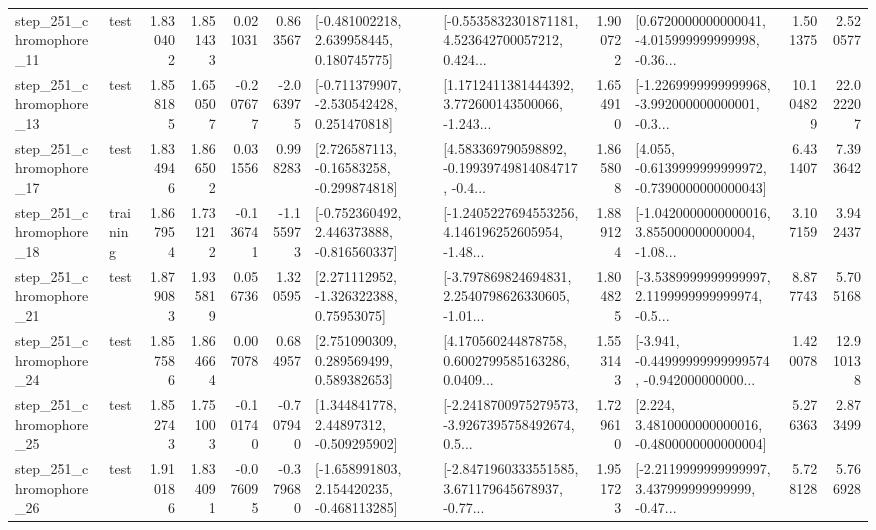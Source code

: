 \begin{tabular}{llrrrrllrlrr}
  step\_251\_chromophore\_11 &      test &      1.830402 &    1.851433 &      0.021031 &  0.863567 &    [-0.481002218, 2.639958445, 0.180745775] &  [-0.5535832301871181, 4.523642700057212, 0.424... &       1.900722 &  [0.6720000000000041, -4.015999999999998, -0.36... &            1.501375 &          2.520577 \\
  step\_251\_chromophore\_13 &      test &      1.858185 &    1.650507 &     -0.207677 & -2.063975 &   [-0.711379907, -2.530542428, 0.251470818] &  [1.1712411381444392, 3.772600143500066, -1.243... &       1.654910 &  [-1.2269999999999968, -3.992000000000001, -0.3... &           10.104829 &         22.022207 \\
  step\_251\_chromophore\_17 &      test &      1.834946 &    1.866502 &      0.031556 &  0.998283 &    [2.726587113, -0.16583258, -0.299874818] &  [4.583369790598892, -0.19939749814084717, -0.4... &       1.865808 &  [4.055, -0.6139999999999972, -0.7390000000000043] &            6.431407 &          7.393642 \\
  step\_251\_chromophore\_18 &  training &      1.867954 &    1.731212 &     -0.136741 & -1.155973 &   [-0.752360492, 2.446373888, -0.816560337] &  [-1.2405227694553256, 4.146196252605954, -1.48... &       1.889124 &  [-1.0420000000000016, 3.855000000000004, -1.08... &            3.107159 &          3.942437 \\
  step\_251\_chromophore\_21 &      test &      1.879083 &    1.935819 &      0.056736 &  1.320595 &     [2.271112952, -1.326322388, 0.75953075] &  [-3.797869824694831, 2.2540798626330605, -1.01... &       1.804825 &  [-3.5389999999999997, 2.1199999999999974, -0.5... &            8.877743 &          5.705168 \\
  step\_251\_chromophore\_24 &      test &      1.857586 &    1.864664 &      0.007078 &  0.684957 &     [2.751090309, 0.289569499, 0.589382653] &  [4.170560244878758, 0.6002799585163286, 0.0409... &       1.553143 &  [-3.941, -0.44999999999999574, -0.942000000000... &            1.420078 &         12.910138 \\
  step\_251\_chromophore\_25 &      test &      1.852743 &    1.751003 &     -0.101740 & -0.707940 &     [1.344841778, 2.44897312, -0.509295902] &  [-2.2418700975279573, -3.9267395758492674, 0.5... &       1.729610 &   [2.224, 3.4810000000000016, -0.4800000000000004] &            5.276363 &          2.873499 \\
  step\_251\_chromophore\_26 &      test &      1.910186 &    1.834091 &     -0.076095 & -0.379680 &   [-1.658991803, 2.154420235, -0.468113285] &  [-2.8471960333551585, 3.671179645678937, -0.77... &       1.951723 &  [-2.2119999999999997, 3.437999999999999, -0.47... &            5.728128 &          5.766928 \\

\end{tabular}
